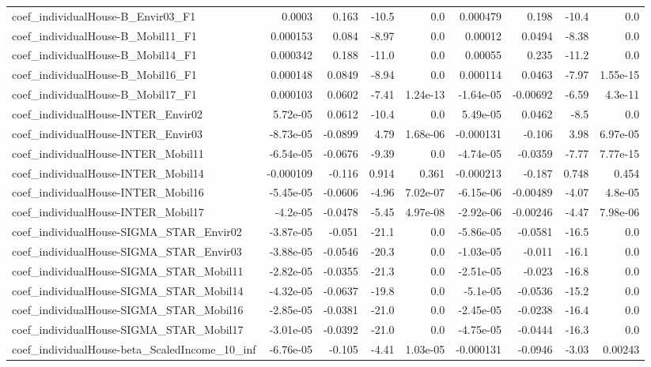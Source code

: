 \begin{tabular}{lrrrrrrrr}
coef_individualHouse-B_Envir03_F1 & 0.0003 & 0.163 & -10.5 & 0.0 & 0.000479 & 0.198 & -10.4 & 0.0 \\
coef_individualHouse-B_Mobil11_F1 & 0.000153 & 0.084 & -8.97 & 0.0 & 0.00012 & 0.0494 & -8.38 & 0.0 \\
coef_individualHouse-B_Mobil14_F1 & 0.000342 & 0.188 & -11.0 & 0.0 & 0.00055 & 0.235 & -11.2 & 0.0 \\
coef_individualHouse-B_Mobil16_F1 & 0.000148 & 0.0849 & -8.94 & 0.0 & 0.000114 & 0.0463 & -7.97 & 1.55e-15 \\
coef_individualHouse-B_Mobil17_F1 & 0.000103 & 0.0602 & -7.41 & 1.24e-13 & -1.64e-05 & -0.00692 & -6.59 & 4.3e-11 \\
coef_individualHouse-INTER_Envir02 & 5.72e-05 & 0.0612 & -10.4 & 0.0 & 5.49e-05 & 0.0462 & -8.5 & 0.0 \\
coef_individualHouse-INTER_Envir03 & -8.73e-05 & -0.0899 & 4.79 & 1.68e-06 & -0.000131 & -0.106 & 3.98 & 6.97e-05 \\
coef_individualHouse-INTER_Mobil11 & -6.54e-05 & -0.0676 & -9.39 & 0.0 & -4.74e-05 & -0.0359 & -7.77 & 7.77e-15 \\
coef_individualHouse-INTER_Mobil14 & -0.000109 & -0.116 & 0.914 & 0.361 & -0.000213 & -0.187 & 0.748 & 0.454 \\
coef_individualHouse-INTER_Mobil16 & -5.45e-05 & -0.0606 & -4.96 & 7.02e-07 & -6.15e-06 & -0.00489 & -4.07 & 4.8e-05 \\
coef_individualHouse-INTER_Mobil17 & -4.2e-05 & -0.0478 & -5.45 & 4.97e-08 & -2.92e-06 & -0.00246 & -4.47 & 7.98e-06 \\
coef_individualHouse-SIGMA_STAR_Envir02 & -3.87e-05 & -0.051 & -21.1 & 0.0 & -5.86e-05 & -0.0581 & -16.5 & 0.0 \\
coef_individualHouse-SIGMA_STAR_Envir03 & -3.88e-05 & -0.0546 & -20.3 & 0.0 & -1.03e-05 & -0.011 & -16.1 & 0.0 \\
coef_individualHouse-SIGMA_STAR_Mobil11 & -2.82e-05 & -0.0355 & -21.3 & 0.0 & -2.51e-05 & -0.023 & -16.8 & 0.0 \\
coef_individualHouse-SIGMA_STAR_Mobil14 & -4.32e-05 & -0.0637 & -19.8 & 0.0 & -5.1e-05 & -0.0536 & -15.2 & 0.0 \\
coef_individualHouse-SIGMA_STAR_Mobil16 & -2.85e-05 & -0.0381 & -21.0 & 0.0 & -2.45e-05 & -0.0238 & -16.4 & 0.0 \\
coef_individualHouse-SIGMA_STAR_Mobil17 & -3.01e-05 & -0.0392 & -21.0 & 0.0 & -4.75e-05 & -0.0444 & -16.3 & 0.0 \\
coef_individualHouse-beta_ScaledIncome_10_inf & -6.76e-05 & -0.105 & -4.41 & 1.03e-05 & -0.000131 & -0.0946 & -3.03 & 0.00243 \\

\end{tabular}
